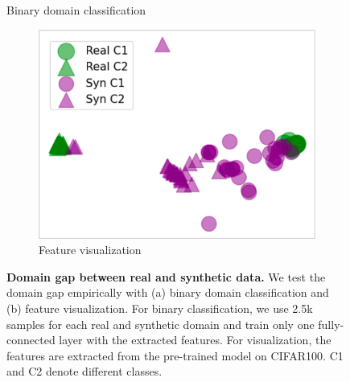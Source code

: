 \begin{figure}
    \centering
        \begin{subtable}[c]{0.3\linewidth}
        \centering
        \caption{Binary domain classification}    
        \label{fig:domain_cls}
    \end{subtable}
    \hspace{8mm}
    \centering
        \begin{subfigure}[c]{0.5\linewidth}
        \centering
        \includegraphics[width=1.0\linewidth]{figures/domain_gap.pdf}
        \caption{Feature visualization}
        \label{fig:domain_feat}
    \end{subfigure}    
    \caption{\textbf{Domain gap between real and synthetic data.} 
    We test the domain gap empirically with (a) binary domain classification and (b) feature visualization.
    For binary classification, we use 2.5k samples for each real and synthetic domain and train only one fully-connected layer with the extracted features.
    For visualization, the features are extracted from the pre-trained model on CIFAR100.
    C1 and C2 denote different classes.
    }
    \label{fig:domain}
\end{figure}

